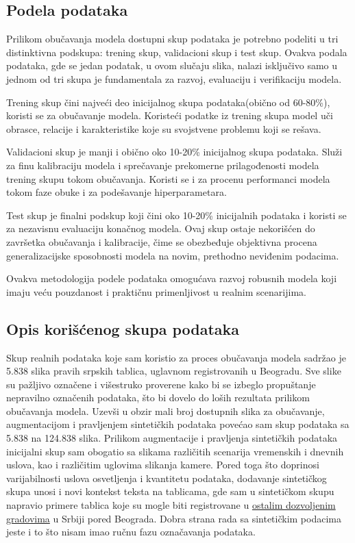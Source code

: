 \documentclass[a4paper,12pt]{article}
\begin{document}
	\subsection{Podela podataka}
	Prilikom obučavanja modela dostupni skup podataka je potrebno podeliti u tri distinktivna podskupa: trening skup, validacioni skup i test skup. Ovakva podala podataka, gde se jedan podatak, u ovom slučaju slika, nalazi isključivo samo u jednom od tri skupa je fundamentala za razvoj, evaluaciju i verifikaciju modela.
	
	Trening skup čini najveći deo inicijalnog skupa podataka(obično od 60-80\%), koristi se za obučavanje modela. Koristeći podatke iz trening skupa model uči obrasce, relacije i karakteristike koje su svojstvene problemu koji se rešava.
	
	Validacioni skup je manji i obično oko 10-20\% inicijalnog skupa podataka. Služi za finu kalibraciju modela i sprečavanje prekomerne prilagođenosti modela trening skupu tokom obučavanja. Koristi se i za procenu performanci modela tokom faze obuke i za podešavanje hiperparametara.
	
	Test skup je finalni podskup koji čini oko 10-20\% inicijalnih podataka i koristi se za nezavisnu evaluaciju konačnog modela. Ovaj skup ostaje nekorišćen do završetka obučavanja i kalibracije, čime se obezbeđuje objektivna procena generalizacijske sposobnosti modela na novim, prethodno neviđenim podacima.
	
	Ovakva metodologija podele podataka omogućava razvoj robusnih modela koji imaju veću pouzdanost i praktičnu primenljivost u realnim scenarijima.
	
	\subsection{Opis korišćenog skupa podataka}
	Skup realnih podataka koje sam koristio za proces obučavanja modela sadržao je 5.838 slika pravih srpskih tablica, uglavnom registrovanih u Beogradu. Sve slike su pažljivo označene i višestruko proverene kako bi se izbeglo propuštanje nepravilno označenih podataka, što bi dovelo do loših rezultata prilikom obučavanja modela. Uzevši u obzir mali broj dostupnih slika za obučavanje, augmentacijom i pravljenjem sintetičkih podataka povećao sam skup podataka sa 5.838 na 124.838 slika. Prilikom augmentacije i pravljenja sintetičkih podataka inicijalni skup sam obogatio sa slikama različitih scenarija vremenskih i dnevnih uslova, kao i različitim uglovima slikanja kamere. Pored toga što doprinosi varijabilnosti uslova osvetljenja i kvantitetu podataka, dodavanje sintetičkog skupa unosi i novi kontekst teksta na tablicama, gde sam u sintetičkom skupu napravio primere tablica koje su mogle biti registrovane u \href{https://www.super-registracija-vozila.rs/registarske-oznake-u-srbiji}{ostalim dozvoljenim gradovima} u Srbiji pored Beograda. Dobra strana rada sa sintetičkim podacima jeste i to što nisam imao ručnu fazu označavanja podataka.
	\newpage
	
\end{document}
